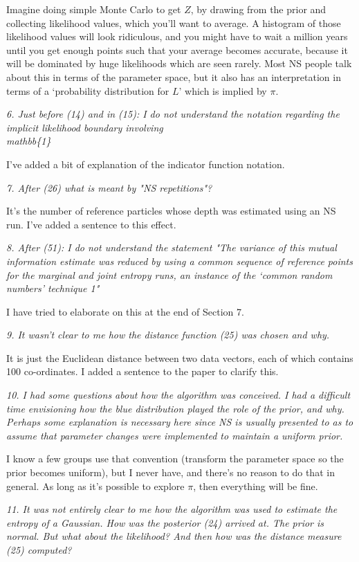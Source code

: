 \documentclass[a4paper, 12pt]{article}
\renewcommand{\quote}{\em \color{orange}}
\begin{document}
Imagine doing simple Monte Carlo to get $Z$, by drawing from the prior and
collecting likelihood values, which you'll want to average. A histogram of
those likelihood values will look ridiculous, and you might have to wait
a million years until you get enough points such that your average becomes
accurate, because it will be dominated by huge likelihoods which are seen
rarely. Most NS people talk about this in terms of the parameter space, but
it also has an interpretation in terms of a `probability distribution for
$L$' which is implied by $\pi$.

{\quote
6. Just before (14) and in (15): I do not understand the notation regarding the implicit likelihood boundary involving \\mathbb\{1\}}

I've added a bit of explanation of the indicator function notation.

{\quote
7. After (26) what is meant by "NS repetitions"?}

It's the number of reference particles
whose depth was estimated using an NS run. I've added a sentence to this effect.

{\quote
8. After (51): I do not understand the statement "The variance of this mutual information estimate was reduced by using a common sequence of reference points for the marginal and joint entropy runs, an instance of the ‘common random numbers’ technique 1"}

I have tried to elaborate on this at the end of Section 7.

{\quote
9. It wasn't clear to me how the distance function (25) was chosen and why.}

It is just the Euclidean distance between two data vectors, each of which
contains 100 co-ordinates. I added a sentence to the paper to clarify this.

{\quote
10. I had some questions about how the algorithm was conceived.  I had a difficult time envisioning how the blue distribution played the role of the prior, and why.  Perhaps some explanation is necessary here since NS is usually presented to as to assume that parameter changes were implemented to maintain a uniform prior.}

I know a few groups use that convention (transform the parameter space so
the prior becomes uniform), but I never have, and there's no reason to do
that in general. As long as it's possible to explore $\pi$, then everything
will be fine.

{\quote
11.  It was not entirely clear to me how the algorithm was used to estimate the entropy of a Gaussian.  How was the posterior (24) arrived at.  The prior is normal.  But what about the likelihood?  And then how was the distance measure (25) computed?}
\end{document}
